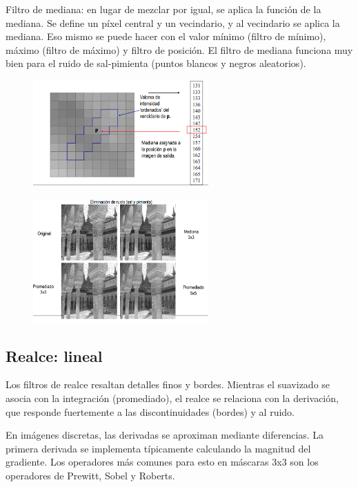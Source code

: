 Filtro de mediana: en lugar de mezclar por igual, se aplica la función de la mediana. Se define un píxel central y un vecindario, y al vecindario se aplica la mediana. Eso mismo se puede hacer con el valor mínimo (filtro de mínimo), máximo (filtro de máximo) y filtro de posición. El filtro de mediana funciona muy bien para el ruido de sal-pimienta (puntos blancos y negros aleatorios). 

\begin{figure}[h]
\centering
\includegraphics[width = 0.6\textwidth]{figs/filtro-median.png}
\end{figure}

\begin{figure}[h]
\centering
\includegraphics[width = 0.6\textwidth]{figs/sal-pimienta.png}
\end{figure}

\subsection{Realce: lineal}
Los filtros de realce resaltan detalles finos y bordes. Mientras el suavizado se asocia con la integración (promediado), el realce se relaciona con la derivación, que responde fuertemente a las discontinuidades (bordes) y al ruido.

En imágenes discretas, las derivadas se aproximan mediante diferencias. La primera derivada se implementa típicamente calculando la magnitud del gradiente. Los operadores más comunes para esto en máscaras 3x3 son los operadores de Prewitt, Sobel y Roberts.

